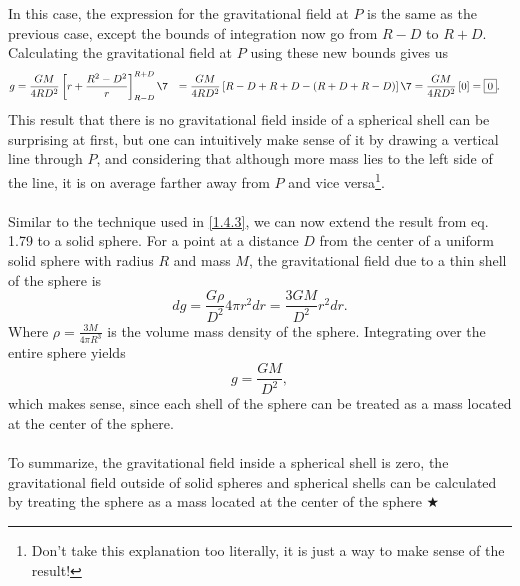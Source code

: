\noindent In this case, the expression for the gravitational field at $P$ is the same as the previous case, except the bounds of integration now go from $R-D$ to $R+D$. Calculating the gravitational field at $P$ using these new bounds gives us
\begin{align}
    g &= \frac{GM}{4RD^2}\left[r + \frac{R^2 - D^2}{r}\right]_{R-D}^{R+D} \7
    &= \frac{GM}{4RD^2}\left[R - D + R + D - (R + D + R - D)\right] \7
    &= \frac{GM}{4RD^2}\left[0\right] = \boxed{0}.
\end{align}
\noindent This result that there is no gravitational field inside of a spherical shell can be surprising at first, but one can intuitively make sense of it by drawing a vertical line through $P$, and considering that although more mass lies to the left side of the line, it is on average farther away from $P$ and vice versa\footnote{Don't take this explanation too literally, it is just a way to make sense of the result!}.\\
\\
\noindent Similar to the technique used in \ref{1.4.3}, we can now extend the result from eq. 1.79 to a solid sphere. For a point at a distance $D$ from the center of a uniform solid sphere with radius $R$ and mass $M$, the gravitational field due to a thin shell of the sphere is
\begin{equation*}
    dg = \frac{G\rho}{D^2}4\pi r^2 dr = \frac{3GM}{D^2}r^2 dr.
\end{equation*}
\noindent Where $\rho = \frac{3M}{4\pi R^3}$ is the volume mass density of the sphere. Integrating over the entire sphere yields
\begin{equation}
    g = \boxed{\frac{GM}{D^2}},
\end{equation}
\noindent which makes sense, since each shell of the sphere can be treated as a mass located at the center of the sphere. \\
\\
\noindent To summarize, the gravitational field inside a spherical shell is zero, the gravitational field outside of solid spheres and spherical shells can be calculated by treating the sphere as a mass located at the center of the sphere $\bigstar$

\clearpage

%
%
%
%

